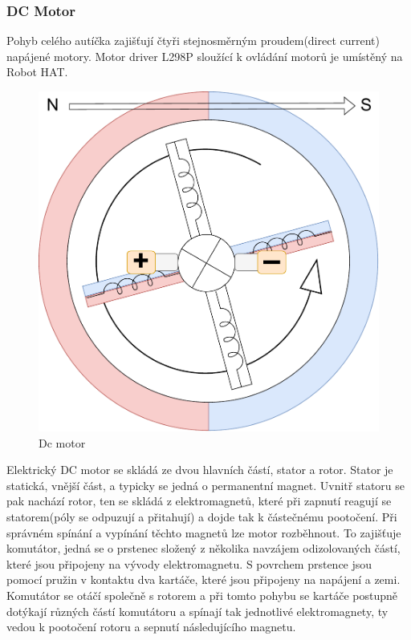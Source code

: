 \newpage
\subsubsection*{DC Motor}
Pohyb celého autíčka zajišťují čtyři stejnosměrným proudem(direct current) napájené motory. Motor driver L298P sloužící k ovládání motorů je umístěný na Robot HAT.

\begin{figure}[h!]
	\centering
	\includegraphics[scale=0.50]{obrazky-figures/dc_motor.pdf}
	\caption{Dc motor}
	\label{}
\end{figure}

Elektrický DC motor se skládá ze dvou hlavních částí, stator a rotor. Stator je statická, vnější část, a typicky se jedná o permanentní magnet. Uvnitř statoru se pak nachází rotor, ten se skládá z elektromagnetů, které při zapnutí reagují se statorem(póly se odpuzují a přitahují) a dojde tak k částečnému pootočení. Při správném spínání a vypínání těchto magnetů lze motor rozběhnout. To zajišťuje komutátor, jedná se o prstenec složený z několika navzájem odizolovaných částí, které jsou připojeny na vývody elektromagnetu. S povrchem prstence jsou pomocí pružin v kontaktu dva kartáče, které jsou připojeny na napájení a zemi. Komutátor se otáčí společně s rotorem a při tomto pohybu se kartáče postupně dotýkají různých částí komutátoru a spínají tak jednotlivé elektromagnety, ty vedou k pootočení rotoru a sepnutí následujícího magnetu. \cite{embeded_robotics}

